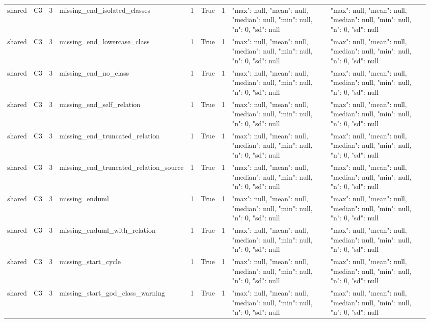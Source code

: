 \begin{tabular}{lllllllll}
shared & C3 & 3 & missing\_end\_isolated\_classes & 1 & True & 1 & {"max": null, "mean": null, "median": null, "min": null, "n": 0, "sd": null} & {"max": null, "mean": null, "median": null, "min": null, "n": 0, "sd": null} \\
shared & C3 & 3 & missing\_end\_lowercase\_class & 1 & True & 1 & {"max": null, "mean": null, "median": null, "min": null, "n": 0, "sd": null} & {"max": null, "mean": null, "median": null, "min": null, "n": 0, "sd": null} \\
shared & C3 & 3 & missing\_end\_no\_class & 1 & True & 1 & {"max": null, "mean": null, "median": null, "min": null, "n": 0, "sd": null} & {"max": null, "mean": null, "median": null, "min": null, "n": 0, "sd": null} \\
shared & C3 & 3 & missing\_end\_self\_relation & 1 & True & 1 & {"max": null, "mean": null, "median": null, "min": null, "n": 0, "sd": null} & {"max": null, "mean": null, "median": null, "min": null, "n": 0, "sd": null} \\
shared & C3 & 3 & missing\_end\_truncated\_relation & 1 & True & 1 & {"max": null, "mean": null, "median": null, "min": null, "n": 0, "sd": null} & {"max": null, "mean": null, "median": null, "min": null, "n": 0, "sd": null} \\
shared & C3 & 3 & missing\_end\_truncated\_relation\_source & 1 & True & 1 & {"max": null, "mean": null, "median": null, "min": null, "n": 0, "sd": null} & {"max": null, "mean": null, "median": null, "min": null, "n": 0, "sd": null} \\
shared & C3 & 3 & missing\_enduml & 1 & True & 1 & {"max": null, "mean": null, "median": null, "min": null, "n": 0, "sd": null} & {"max": null, "mean": null, "median": null, "min": null, "n": 0, "sd": null} \\
shared & C3 & 3 & missing\_enduml\_with\_relation & 1 & True & 1 & {"max": null, "mean": null, "median": null, "min": null, "n": 0, "sd": null} & {"max": null, "mean": null, "median": null, "min": null, "n": 0, "sd": null} \\
shared & C3 & 3 & missing\_start\_cycle & 1 & True & 1 & {"max": null, "mean": null, "median": null, "min": null, "n": 0, "sd": null} & {"max": null, "mean": null, "median": null, "min": null, "n": 0, "sd": null} \\
shared & C3 & 3 & missing\_start\_god\_class\_warning & 1 & True & 1 & {"max": null, "mean": null, "median": null, "min": null, "n": 0, "sd": null} & {"max": null, "mean": null, "median": null, "min": null, "n": 0, "sd": null} \\

\end{tabular}
